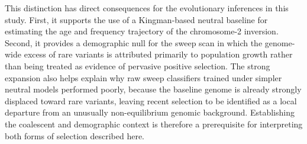 \documentclass[11pt]{article}
\begin{document}
This distinction has direct consequences for the evolutionary inferences in this study. First, it supports the use of a Kingman-based neutral baseline for estimating the age and frequency trajectory of the chromosome-2 inversion. Second, it provides a demographic null for the sweep scan in which the genome-wide excess of rare variants is attributed primarily to population growth rather than being treated as evidence of pervasive positive selection. The strong expansion also helps explain why raw sweep classifiers trained under simpler neutral models performed poorly, because the baseline genome is already strongly displaced toward rare variants, leaving recent selection to be identified as a local departure from an unusually non-equilibrium genomic background. Establishing the coalescent and demographic context is therefore a prerequisite for interpreting both forms of selection described here.
\end{document}
